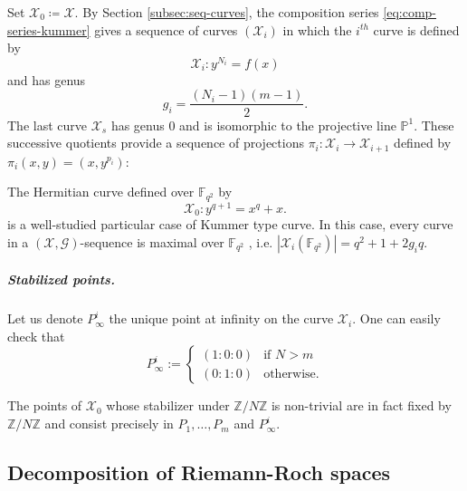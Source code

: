 \documentclass[10pt,a4paper]{article}
\newcommand\F{\mathbb{F}}
\newcommand\PP{\mathbb{P}}
\newcommand\Z{\mathbb{Z}}
\renewcommand{\vec}[1]{\boldsymbol{#1}}
\newcommand{\size}[1]{\left|#1\right|}
\newcommand\calX{\mathcal{X}}
\newcommand\calG{\mathcal{G}}
\newcommand\XGseq{(\calX, \vec{\calG})}
\newcommand\mydef{\coloneqq}
\theoremstyle{plain}
\theoremstyle{plain}
\theoremstyle{definition}
\theoremstyle{remark}
\theoremstyle{plain}
\begin{document}
Set $\calX_0\mydef \calX$. By Section \ref{subsec:seq-curves}, the composition series \eqref{eq:comp-series-kummer} gives a sequence of curves $(\calX_i)$ in which the $i^{th}$ curve is defined by
\begin{equation}\label{Crvi}
	\calX_i : y^{N_i}=f(x)
\end{equation}
and has genus
\[g_i=\frac{(N_i-1)(m-1)}{2}.\]
The last curve $\calX_{s}$ has genus 0 and is isomorphic to the projective line $\PP^1$. These successive quotients provide a sequence of projections $\pi_i: \calX_i \rightarrow \calX_{i+1}$ defined by ${\pi_i(x,y)=(x,y^{p_i})}$:

\begin{center}
\end{center} 

\begin{example}\label{ex:hermitian} 
	The Hermitian curve defined over $\F_{q^2}$ by
	\begin{equation}\label{eq:hermitian}
		\calX_0 : y^{q+1} = x^q+x.
	\end{equation}
	is a well-studied particular case of Kummer type curve. In this case, every curve in a $\XGseq$-sequence is maximal over $\F_{q^2}$ \cite[Proposition 6]{L87}, i.e. $\size{\calX_i(\F_{q^2})}=q^2+1+2g_iq$. 
\end{example}

\subparagraph*{Stabilized points.}

Let us denote $P^i_\infty$ the unique point at infinity on the curve $\calX_i$. One can easily check that 
\[P_\infty^i:=\left\{\begin{array}{cl}
	(1:0:0) &\text{if } N > m \\
	(0:1:0) & \text{otherwise.}
\end{array}\right.\]
%

The points of $\calX_0$ whose stabilizer under $\Z/N\Z$ is non-trivial are in fact fixed by $\Z/N\Z$ and consist precisely in $P_1,\dots,P_m$ and $P_\infty^i$.

\subsection{Decomposition of Riemann-Roch spaces}
\end{document}
